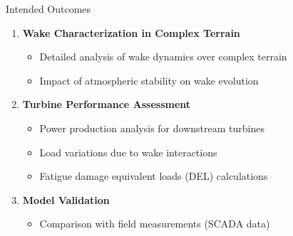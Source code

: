 \documentclass[aspectratio=1610]{beamer}
\begin{document}
\begin{frame}{Intended Outcomes}
\begin{tcolorbox}[colback=blue!3!white,colframe=blue!65!black,title=Outcomes:]
\vspace{0.1cm}
    \begin{enumerate}
        \item \textbf{Wake Characterization in Complex Terrain}
        
        \vspace{0.3cm}
        \begin{itemize}
            \item Detailed analysis of wake dynamics over complex terrain
            
            \vspace{0.15cm}
            \item Impact of atmospheric stability on wake evolution
        \end{itemize}
        
        \vspace{0.25cm}
        \item \textbf{Turbine Performance Assessment}
        
        \vspace{0.2cm}
        \begin{itemize}
            \item Power production analysis for downstream turbines
            
            \vspace{0.15cm}
            \item Load variations due to wake interactions
            
            \vspace{0.15cm}
            \item Fatigue damage equivalent loads (DEL) calculations
        \end{itemize}
        
        \vspace{0.25cm}
        \item \textbf{Model Validation}
        
        \vspace{0.2cm}
        \begin{itemize}
            \item Comparison with field measurements (SCADA data)
        \end{itemize}
    \end{enumerate} 
\end{tcolorbox}

\end{frame}
\end{document}
